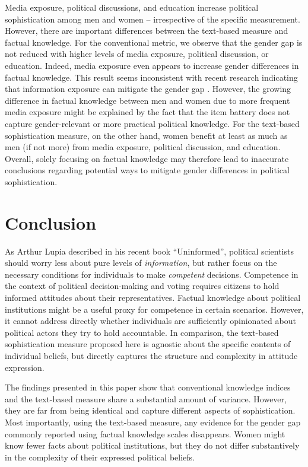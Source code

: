 \documentclass[12pt]{article}
\begin{document}
Media exposure, political discussions, and education increase political sophistication among men and women -- irrespective of the specific measurement. However, there are important differences between the text-based measure and factual knowledge. For the conventional metric, we observe that the gender gap is not reduced with higher levels of media exposure, political discussion, or education. Indeed, media exposure even appears to increase gender differences in factual knowledge. This result seems inconsistent with recent research indicating that information exposure can mitigate the gender gap \citep[e.g.,][]{jerit2017revisiting}. However, the growing difference in factual knowledge between men and women due to more frequent media exposure might be explained by the fact that the item battery does not capture gender-relevant \citep{dolan2011women} or more practical \citep{stolle2010women} political knowledge. For the text-based sophistication measure, on the other hand, women benefit at least as much as men (if not more) from media exposure, political discussion, and education. Overall, solely focusing on factual knowledge may therefore lead to inaccurate conclusions regarding potential ways to mitigate gender differences in political sophistication.


\section*{Conclusion}

As Arthur Lupia \citeyearpar{lupia2015uninformed} described in his recent book ``Uninformed'', political scientists should worry less about pure levels of \textit{information}, but rather focus on the necessary conditions for individuals to make \textit{competent} decisions. Competence in the context of political decision-making and voting requires citizens to hold informed attitudes about their representatives. Factual knowledge about political institutions might be a useful proxy for competence in certain scenarios. However, it cannot address directly whether individuals are sufficiently opinionated about political actors they try to hold accountable. In comparison, the text-based sophistication measure proposed here is agnostic about the specific contents of individual beliefs, but directly captures the structure and complexity in attitude expression.

The findings presented in this paper show that conventional knowledge indices and the text-based measure share a substantial amount of variance. However, they are far from being identical and capture different aspects of sophistication. Most importantly, using the text-based measure, any evidence for the gender gap commonly reported using factual knowledge scales disappears. Women might know fewer facts about political institutions, but they do not differ substantively in the complexity of their expressed political beliefs.
\end{document}
